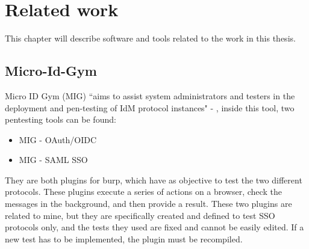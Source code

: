 \chapter{Related work}
\label{chap:Related_work}
This chapter will describe software and tools related to the work in this thesis.

\section{Micro-Id-Gym}
\label{sec:micro-id-gym}
Micro ID Gym (MIG) ``aims to assist system administrators and testers in the deployment and pen-testing of IdM protocol instances" - \cite{micro_id_gym}, inside this tool, two pentesting tools can be found:
\begin{itemize}
    \item MIG - OAuth/OIDC \cite{claudio_grisenti}
    \item MIG - SAML SSO \cite{stefano_facchini}
\end{itemize}
They are both plugins for \Gls{burp}, which have as objective to test the two different protocols. These plugins execute a series of actions on a browser, check the messages in the background, and then provide a result.
These two plugins are related to mine, but they are specifically created and defined to test SSO protocols only, and the tests they used are fixed and cannot be easily edited. If a new test has to be implemented, the plugin must be recompiled.

